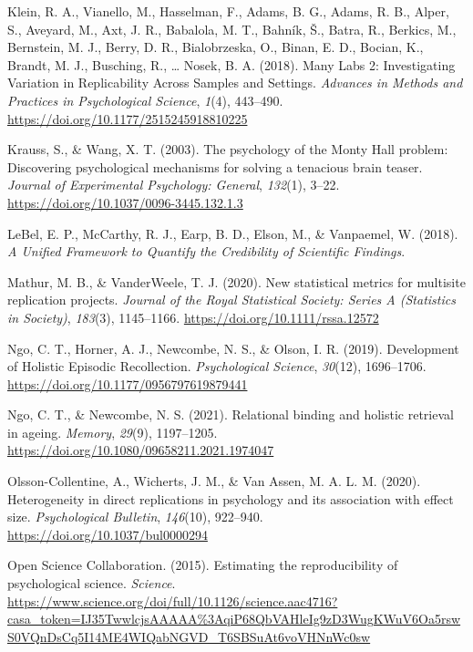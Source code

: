\documentclass[
  english,
  a4paper,
]{article}
\newlength{\cslhangindent}
\newenvironment{CSLReferences}[2] %
{\begin{list}{}{%
			\setlength{\itemindent}{0pt}
			\setlength{\leftmargin}{0pt}
			\setlength{\parsep}{0pt}
			\ifodd #1
			\setlength{\leftmargin}{\cslhangindent}
			\setlength{\itemindent}{-1\cslhangindent}
			\fi
			\setlength{\itemsep}{#2\baselineskip}}}
	{\end{list}}
\begin{document}
\begin{CSLReferences}{1}{0}
Klein, R. A., Vianello, M., Hasselman, F., Adams, B. G., Adams, R. B., Alper, S., Aveyard, M., Axt, J. R., Babalola, M. T., Bahník, Š., Batra, R., Berkics, M., Bernstein, M. J., Berry, D. R., Bialobrzeska, O., Binan, E. D., Bocian, K., Brandt, M. J., Busching, R., \ldots{} Nosek, B. A. (2018). Many {Labs} 2: {Investigating Variation} in {Replicability Across Samples} and {Settings}. \emph{Advances in Methods and Practices in Psychological Science}, \emph{1}(4), 443--490. \url{https://doi.org/10.1177/2515245918810225}

Krauss, S., \& Wang, X. T. (2003). The psychology of the {Monty Hall} problem: {Discovering} psychological mechanisms for solving a tenacious brain teaser. \emph{Journal of Experimental Psychology: General}, \emph{132}(1), 3--22. \url{https://doi.org/10.1037/0096-3445.132.1.3}

LeBel, E. P., McCarthy, R. J., Earp, B. D., Elson, M., \& Vanpaemel, W. (2018). \emph{A {Unified Framework} to {Quantify} the {Credibility} of {Scientific Findings}}.

Mathur, M. B., \& VanderWeele, T. J. (2020). New statistical metrics for multisite replication projects. \emph{Journal of the Royal Statistical Society: Series A (Statistics in Society)}, \emph{183}(3), 1145--1166. \url{https://doi.org/10.1111/rssa.12572}

Ngo, C. T., Horner, A. J., Newcombe, N. S., \& Olson, I. R. (2019). Development of {Holistic Episodic Recollection}. \emph{Psychological Science}, \emph{30}(12), 1696--1706. \url{https://doi.org/10.1177/0956797619879441}

Ngo, C. T., \& Newcombe, N. S. (2021). Relational binding and holistic retrieval in ageing. \emph{Memory}, \emph{29}(9), 1197--1205. \url{https://doi.org/10.1080/09658211.2021.1974047}

Olsson-Collentine, A., Wicherts, J. M., \& Van Assen, M. A. L. M. (2020). Heterogeneity in direct replications in psychology and its association with effect size. \emph{Psychological Bulletin}, \emph{146}(10), 922--940. \url{https://doi.org/10.1037/bul0000294}

Open Science Collaboration. (2015). Estimating the reproducibility of psychological science. \emph{Science}. \url{https://www.science.org/doi/full/10.1126/science.aac4716?casa_token=IJ35TwwlcjsAAAAA\%3AqiP68QbVAHleIg9zD3WugKWuV6Oa5rswS0VQnDsCq5I14ME4WIQabNGVD_T6SBSuAt6voVHNnWc0sw}


\end{CSLReferences}
\end{document}
